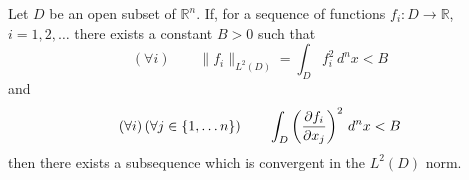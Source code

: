 \documentclass[12pt]{article}
\begin{document}
Let $D$ be an open subset of $\mathbb{R}^n$.  If, for a sequence of functions $f_i \colon D \to \mathbb{R}$, $i = 1,2,\ldots$ there exists a constant $B>0$ such that 
 $$(\forall i) \qquad \| f_i \|_{L^2 (D)} = \int_D f_i^2 \, d^n x < B$$
and
 $$(\forall i) \, (\forall j \in \{1, \ldots n \}) \qquad \int_D \left( {\partial f_i \over \partial x_j} \right)^2 \, d^n x < B$$
then there exists a subsequence which is convergent in the $L^2 (D)$ norm.
\end{document}
